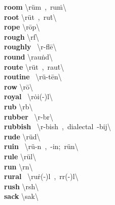 \documentclass[10pt,a4paper]{article}
\begin{document}
\begin{multicols}{2}
\textbf{ room }\quad \textbackslash \textprimstress r\"{u}m\ ,\ \textprimstress ru\. m\textbackslash \\
\textbf{ root }\quad \textbackslash \textprimstress r\"{u}t\ ,\ \textprimstress ru\. t\textbackslash \\
\textbf{ rope }\quad \textbackslash \textprimstress r\={o}p\textbackslash \\
\textbf{ rough }\quad \textbackslash \textprimstress r\textschwa f\textbackslash \\
\textbf{ roughly }\quad \ \textbackslash \textprimstress r\textschwa -fl\={e}\textbackslash \\
\textbf{ round }\quad \textbackslash \textprimstress rau\. nd\textbackslash \\
\textbf{ route }\quad \textbackslash \textprimstress r\"{u}t\ ,\ \textprimstress rau\. t\textbackslash \\
\textbf{ routine }\quad \ \textbackslash r\"{u}-\textprimstress t\={e}n\textbackslash \\
\textbf{ row }\quad \textbackslash \textprimstress r\={o}\textbackslash \\
\textbf{ royal }\quad \ \textbackslash \textprimstress r\.{o}i(-\textschwa )l\textbackslash \\
\textbf{ rub }\quad \textbackslash \textprimstress r\textschwa b\textbackslash \\
\textbf{ rubber }\quad \ \textbackslash \textprimstress r\textschwa -b\textschwa r\textbackslash \\
\textbf{ rubbish }\quad \ \textbackslash \textprimstress r\textschwa -bish\ ,\ dialectal\ -bij\textbackslash \\
\textbf{ rude }\quad \textbackslash \textprimstress r\"{u}d\textbackslash \\
\textbf{ ruin }\quad \ \textbackslash \textprimstress r\"{u}-\textschwa n\ ,\ -\textsecstress in;\ \textprimstress r\"{u}n\textbackslash \\
\textbf{ rule }\quad \textbackslash \textprimstress r\"{u}l\textbackslash \\
\textbf{ run }\quad \textbackslash \textprimstress r\textschwa n\textbackslash \\
\textbf{ rural }\quad \ \textbackslash \textprimstress ru\. r(-\textschwa )l\ ,\ \textprimstress r\textschwa r(-\textschwa )l\textbackslash \\
\textbf{ rush }\quad \textbackslash \textprimstress r\textschwa sh\textbackslash \\
\textbf{ sack }\quad \textbackslash \textprimstress sak\textbackslash \\

\end{multicols}
\end{document}
